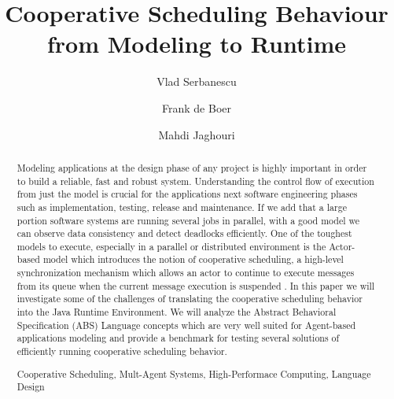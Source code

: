 \documentclass[runningheads,a4paper]{llncs}
\newcommand{\keywords}[1]{\par\addvspace\baselineskip
\noindent\keywordname\enspace\ignorespaces#1}
\begin{document}
\mainmatter  %

\title{Cooperative Scheduling Behaviour from Modeling to Runtime}


%
%
\author{Vlad Serbanescu
\and Frank de Boer \and Mahdi Jaghouri}
%


%
%

\maketitle


\begin{abstract}
Modeling applications at the design phase of any project is highly important in order to build a reliable, fast and robust system. Understanding the control flow of execution from just the model is crucial for the applications next software engineering phases such as implementation, testing, release and maintenance.  If we add that a large portion software systems are running several jobs in parallel, with a good model we can observe data consistency and detect deadlocks efficiently. One of the toughest models to execute, especially in a parallel or distributed environment is the Actor-based model which introduces the notion of cooperative scheduling, a high-level synchronization mechanism which allows an actor to continue to execute messages from its queue when the current message execution is suspended . In this paper we will investigate some of the challenges of translating the cooperative scheduling behavior into the Java Runtime Environment. We will analyze the Abstract Behavioral Specification (ABS) Language concepts which are very well suited for Agent-based applications modeling and provide a benchmark for testing several solutions of efficiently running cooperative scheduling behavior. 

\keywords{Cooperative Scheduling, Mult-Agent Systems, High-Performace Computing, Language Design}
\end{abstract}
\end{document}
